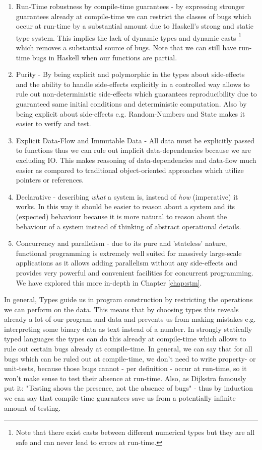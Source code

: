 \begin{enumerate}
	\item Run-Time robustness by compile-time guarantees - by expressing stronger guarantees already at compile-time we can restrict the classes of bugs which occur at run-time by a substantial amount due to Haskell's strong and static type system.  This implies the lack of dynamic types and dynamic casts \footnote{Note that there exist casts between different numerical types but they are all safe and can never lead to errors at run-time.} which removes a substantial source of bugs.  Note that we can still have run-time bugs in Haskell when our functions are partial.
	\item Purity - By being explicit and polymorphic in the types about side-effects and the ability to handle side-effects explicitly in a controlled way allows to rule out non-deterministic side-effects which guarantees reproducibility due to guaranteed same initial conditions and deterministic computation. Also by being explicit about side-effects e.g. Random-Numbers and State makes it easier to verify and test.
	\item Explicit Data-Flow and Immutable Data - All data must be explicitly passed to functions thus we can rule out implicit data-dependencies because we are excluding IO. This makes reasoning of data-dependencies and data-flow much easier as compared to traditional object-oriented approaches which utilize pointers or references.
	\item Declarative - describing \textit{what} a system is, instead of \textit{how} (imperative) it works. In this way it should be easier to reason about a system and its (expected) behaviour because it is more natural to reason about the behaviour of a system instead of thinking of abstract operational details.
	\item Concurrency and parallelism - due to its pure and 'stateless' nature, functional programming is extremely well suited for massively large-scale applications as it allows adding parallelism without any side-effects and provides very powerful and convenient facilities for concurrent programming. We have explored this more in-depth in Chapter \ref{chap:stm}.
\end{enumerate}

In general, Types guide us in program construction by restricting the operations we can perform on the data. This means that by choosing types this reveals already a lot of our program and data and prevents us from making mistakes e.g. interpreting some binary data as text instead of a number. In strongly statically typed languages the types can do this already at compile-time which allows to rule out certain bugs already at compile-time. In general, we can say that for all bugs which can be ruled out at compile-time, we don't need to write property- or unit-tests, because those bugs cannot - per definition - occur at run-time, so it won't make sense to test their absence at run-time. Also, as Dijkstra famously put it: "Testing shows the presence, not the absence of bugs" - thus by induction we can say that compile-time guarantees save us from a potentially infinite amount of testing.

